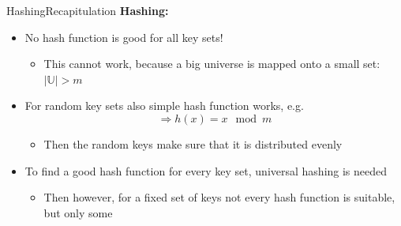 

\begin{frame}{Hashing}{Recapitulation}
  \textbf{Hashing:}
  \begin{itemize}   
  \item<2->
    No hash function is good for all key sets!\\
    \begin{itemize}
    \item<3->
      This cannot work, because a big universe
      is mapped onto a small set: {\color{MainA}$\vert \mathbb{U} \vert > m$}
    \end{itemize}
  \item<4->
    For random key sets also simple hash function works, e.g.
     {\color{MainA}\[\Rightarrow h(x) = x \mod m\]}\vspace*{-2em}
     \begin{itemize}
    \item<5->
      Then the random keys make sure that it is distributed evenly
     \end{itemize}
  \item<6->
   To find a good hash function for every key set, universal hashing is needed
     \begin{itemize}
    \item<7->
      Then however, for a fixed set of keys not every hash function is suitable,
      but only some
    \end{itemize}
  \end{itemize}
\end{frame}


